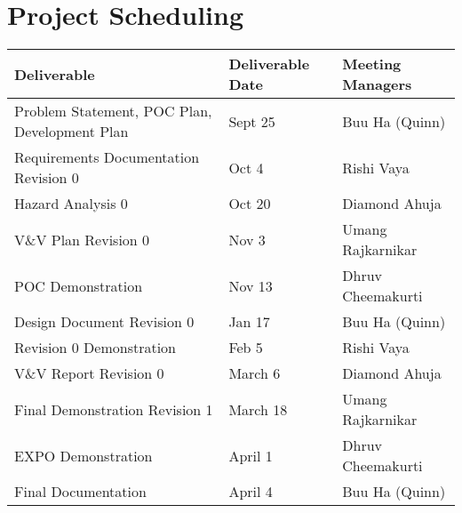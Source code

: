 \documentclass{article}
\begin{document}
\section{Project Scheduling}

\begin{table}[H]
\begin{tabular}{|p{4cm}|p{3cm}|p{3cm}|}
\hline
\textbf{Deliverable}                                   & \textbf{Deliverable Date}  & \textbf{Meeting Managers}\\ \hline
Problem Statement, POC Plan, Development Plan & Sept 25           &Buu Ha (Quinn)\\ \hline
Requirements Documentation Revision 0         & Oct 4             &Rishi Vaya\\ \hline
Hazard Analysis 0                             & Oct 20            &Diamond Ahuja\\ \hline
V\&V Plan Revision 0                           & Nov 3             &Umang Rajkarnikar\\ \hline
POC Demonstration                             & Nov 13            &Dhruv Cheemakurti\\ \hline
Design Document Revision 0                    & Jan 17            &Buu Ha (Quinn)\\ \hline
Revision 0 Demonstration                      & Feb 5             &Rishi Vaya\\ \hline
V\&V Report Revision 0                         & March 6           &Diamond Ahuja\\ \hline
Final Demonstration Revision 1                & March 18          &Umang Rajkarnikar\\ \hline
EXPO Demonstration                            & April 1           &Dhruv Cheemakurti\\ \hline
Final Documentation                           & April 4           &Buu Ha (Quinn)\\ \hline
\end{tabular}
\end{table}
\end{document}

